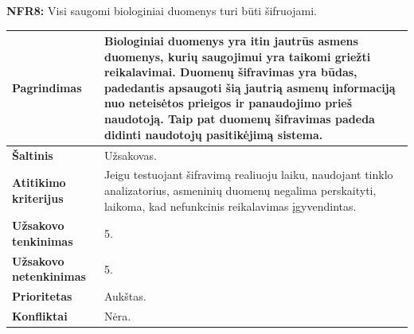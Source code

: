 \documentclass[12pt]{article}
\begin{document}
\noindent \textbf{NFR8:} Visi saugomi biologiniai duomenys turi būti šifruojami.
\label{sec:NFR8}
\begin{table}[htb!]
    \captionsetup{justification=centering}
    \vskip -10pt
    \begin{tabular}{|m{4.9cm}|m{11cm}|}
        \hline
        \raggedleft \textbf{\cellcolor{deepchampagne}Pagrindimas} &
        Biologiniai duomenys yra itin jautrūs asmens duomenys, kurių saugojimui
        yra taikomi griežti reikalavimai. Duomenų šifravimas yra būdas,
        padedantis apsaugoti šią jautrią asmenų informaciją nuo neteisėtos
        prieigos ir panaudojimo prieš naudotoją. Taip pat duomenų šifravimas
        padeda didinti naudotojų pasitikėjimą sistema. \\
        \hline
        \raggedleft \textbf{\cellcolor{deepchampagne}Šaltinis} & Užsakovas. \\
        \hline
        \raggedleft \textbf{\cellcolor{deepchampagne}Atitikimo kriterijus} & 
        Jeigu testuojant šifravimą realiuoju laiku, naudojant tinklo
        analizatorius, asmeninių duomenų negalima perskaityti, laikoma, kad
        nefunkcinis reikalavimas įgyvendintas. \\
        \hline
        \raggedleft \textbf{\cellcolor{deepchampagne}Užsakovo tenkinimas} & 5. \\
        \hline
        \raggedleft \textbf{\cellcolor{deepchampagne}Užsakovo netenkinimas} & 5. \\
        \hline
        \raggedleft \textbf{\cellcolor{deepchampagne}Prioritetas} & Aukštas. \\
        \hline
        \raggedleft \textbf{\cellcolor{deepchampagne}Konfliktai} & Nėra. \\
        \hline
    \end{tabular}
\end{table}
\end{document}
